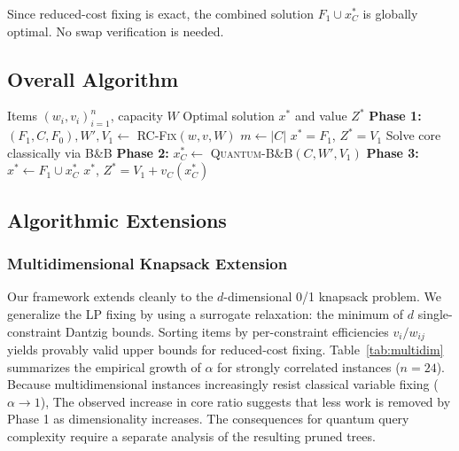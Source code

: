 \documentclass[conference]{IEEEtran} \IEEEoverridecommandlockouts
\begin{document}
Since reduced-cost fixing is exact, the combined solution $F_1 \cup x^*_C$ is globally optimal. No swap verification is needed.

\subsection{Overall Algorithm}

\begin{algorithm}[h]
\caption{LP-Pruned Quantum B\&B Knapsack Solver}
\label{alg:hybrid}
\begin{algorithmic}[1]
\REQUIRE Items $(w_i, v_i)_{i=1}^n$, capacity $W$
\ENSURE Optimal solution $x^*$ and value $Z^*$
\STATE \textbf{Phase 1:} $(F_1, C, F_0), W', V_1 \leftarrow$ \textsc{RC-Fix}$(w, v, W)$ 
\STATE $m \leftarrow |C|$
    \RETURN $x^* = F_1$, $Z^* = V_1$
    \STATE Solve core classically via B\&B
\ELSE
    \STATE \textbf{Phase 2:} $x^*_C \leftarrow$ \textsc{Quantum-B\&B}$(C, W', V_1)$ 
\ENDIF
\STATE \textbf{Phase 3:} $x^* \leftarrow F_1 \cup x^*_C$
\RETURN $x^*$, $Z^* = V_1 + v_C(x^*_C)$
\end{algorithmic}
\end{algorithm}

\subsection{Algorithmic Extensions}



\subsubsection{Multidimensional Knapsack Extension}
Our framework extends cleanly to the $d$-dimensional 0/1 knapsack problem. We generalize the LP fixing by using a surrogate relaxation: the minimum of $d$ single-constraint Dantzig bounds. Sorting items by per-constraint efficiencies $v_i/w_{ij}$ yields provably valid upper bounds for reduced-cost fixing. Table~\ref{tab:multidim} summarizes the empirical growth of $\alpha$ for strongly correlated instances ($n=24$). Because multidimensional instances increasingly resist classical variable fixing ($\alpha \to 1$), The observed increase in core ratio suggests that less work is removed by Phase 1 as dimensionality increases. The consequences for quantum query complexity require a separate analysis of the resulting pruned trees.
\end{document}
